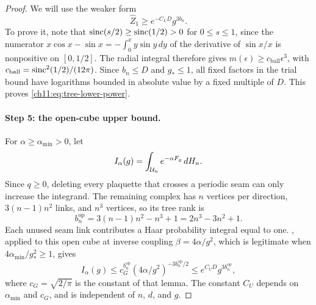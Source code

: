 \begin{proof}
We will use the weaker form
\begin{equation}\label{ch11:eq:tree-lower-power}
 \widehat Z_1\ge e^{-C_LD}g^{3b_n}.
\end{equation}
To prove it, note that $\operatorname{sinc}(s/2)\ge\operatorname{sinc}(1/2)>0$ for $0\le s\le1$, since the numerator $x\cos x-\sin x=-\int_0^xy\sin y\,dy$ of the derivative of $\sin x/x$ is nonpositive on $[0,1/2]$. The radial integral therefore gives $m(\epsilon)\ge c_{\mathrm{ball}}\epsilon^3$, with $c_{\mathrm{ball}}=\operatorname{sinc}^2(1/2)/(12\pi)$. Since $b_n\le D$ and $g_*\le1$, all fixed factors in the trial bound have logarithms bounded in absolute value by a fixed multiple of $D$. This proves \eqref{ch11:eq:tree-lower-power}.

\paragraph{Step 5: the open-cube upper bound.}
For $\alpha\ge\alpha_{\min}>0$, let
\[
 I_\alpha(g)=\int_{\mathcal U_{n}}e^{-\alpha F_g}\,dH_n.
\]
Since $q\ge0$, deleting every plaquette that crosses a periodic seam can only increase the integrand. The remaining complex has $n$ vertices per direction, $3(n-1)n^2$ links, and $n^3$ vertices, so its tree rank is
\[
 b_n^{\mathrm{op}}=3(n-1)n^2-n^3+1=2n^3-3n^2+1.
\]
Each unused seam link contributes a Haar probability integral equal to one. , applied to this open cube at inverse coupling $\beta=4\alpha/g^2$, which is legitimate when $4\alpha_{\min}/g_*^2\ge1$, gives
\begin{equation}\label{ch11:eq:FE0-upper-power}
 I_\alpha(g)\le c_G^{b_n^{\mathrm{op}}}(4\alpha/g^2)^{-3b_n^{\mathrm{op}}/2}\le e^{C_UD}g^{3b_n^{\mathrm{op}}},
\end{equation}
where $c_G=\sqrt{2/\pi}$ is the constant of that lemma. The constant $C_U$ depends on $\alpha_{\min}$ and $c_G$, and is independent of $n$, $d$, and $g$.


\end{proof}
